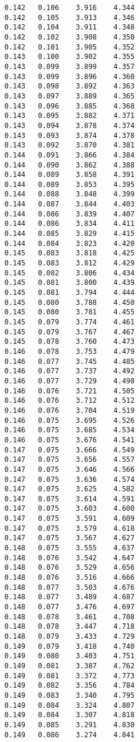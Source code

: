 \begin{verbatim}
   0.142   0.106    3.916    4.344
   0.142   0.105    3.913    4.346
   0.142   0.104    3.911    4.348
   0.142   0.102    3.908    4.350
   0.142   0.101    3.905    4.352
   0.143   0.100    3.902    4.355
   0.143   0.099    3.899    4.357
   0.143   0.099    3.896    4.360
   0.143   0.098    3.892    4.363
   0.143   0.097    3.889    4.365
   0.143   0.096    3.885    4.368
   0.143   0.095    3.882    4.371
   0.143   0.094    3.878    4.374
   0.143   0.093    3.874    4.378
   0.143   0.092    3.870    4.381
   0.144   0.091    3.866    4.384
   0.144   0.090    3.862    4.388
   0.144   0.089    3.858    4.391
   0.144   0.089    3.853    4.395
   0.144   0.088    3.848    4.399
   0.144   0.087    3.844    4.403
   0.144   0.086    3.839    4.407
   0.144   0.086    3.834    4.411
   0.144   0.085    3.829    4.415
   0.144   0.084    3.823    4.420
   0.145   0.083    3.818    4.425
   0.145   0.083    3.812    4.429
   0.145   0.082    3.806    4.434
   0.145   0.081    3.800    4.439
   0.145   0.081    3.794    4.444
   0.145   0.080    3.788    4.450
   0.145   0.080    3.781    4.455
   0.145   0.079    3.774    4.461
   0.145   0.079    3.767    4.467
   0.145   0.078    3.760    4.473
   0.146   0.078    3.753    4.479
   0.146   0.077    3.745    4.485
   0.146   0.077    3.737    4.492
   0.146   0.077    3.729    4.498
   0.146   0.076    3.721    4.505
   0.146   0.076    3.712    4.512
   0.146   0.076    3.704    4.519
   0.146   0.075    3.695    4.526
   0.146   0.075    3.685    4.534
   0.146   0.075    3.676    4.541
   0.147   0.075    3.666    4.549
   0.147   0.075    3.656    4.557
   0.147   0.075    3.646    4.566
   0.147   0.075    3.636    4.574
   0.147   0.075    3.625    4.582
   0.147   0.075    3.614    4.591
   0.147   0.075    3.603    4.600
   0.147   0.075    3.591    4.609
   0.147   0.075    3.579    4.618
   0.147   0.075    3.567    4.627
   0.148   0.075    3.555    4.637
   0.148   0.076    3.542    4.647
   0.148   0.076    3.529    4.656
   0.148   0.076    3.516    4.666
   0.148   0.077    3.503    4.676
   0.148   0.077    3.489    4.687
   0.148   0.077    3.476    4.697
   0.148   0.078    3.461    4.708
   0.148   0.078    3.447    4.718
   0.148   0.079    3.433    4.729
   0.149   0.079    3.418    4.740
   0.149   0.080    3.403    4.751
   0.149   0.081    3.387    4.762
   0.149   0.081    3.372    4.773
   0.149   0.082    3.356    4.784
   0.149   0.083    3.340    4.795
   0.149   0.084    3.324    4.807
   0.149   0.084    3.307    4.818
   0.149   0.085    3.291    4.830
   0.149   0.086    3.274    4.841

\end{verbatim}
